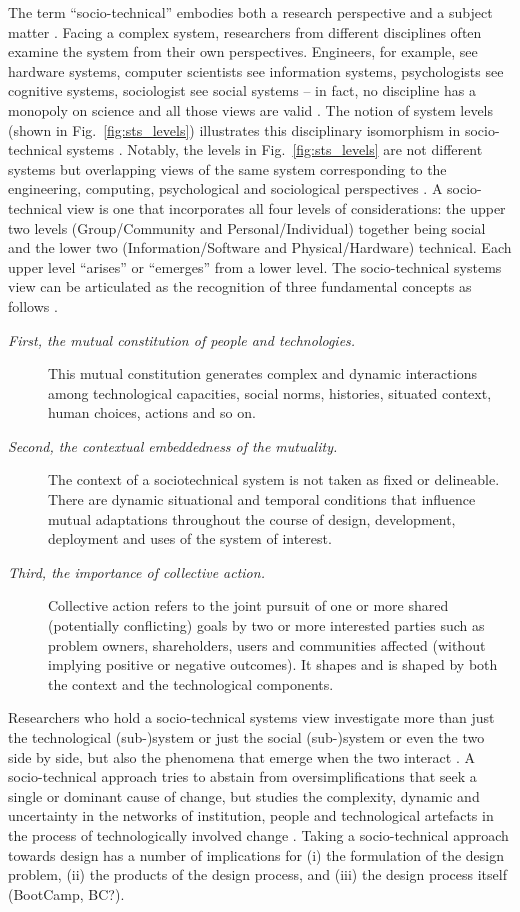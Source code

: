 The term ``socio-technical'' embodies both a research perspective and a subject matter \cite{Lee2001}. Facing a complex system, researchers from different disciplines often examine the system from their own perspectives. Engineers, for example, see hardware systems, computer scientists see information systems, psychologists see cognitive systems, sociologist see social systems -- in fact, no discipline has a monopoly on science and all those views are valid \cite{Whitworth2013}. 
The notion of system levels (shown in Fig.~\ref{fig:sts_levels}) illustrates this disciplinary isomorphism in socio-technical systems \cite{Whitworth2009,Whitworth2013}. Notably, the levels in Fig.~\ref{fig:sts_levels} are not different systems but overlapping views of the same system corresponding to the engineering, computing, psychological and sociological perspectives \cite{Whitworth2009}. A socio-technical view is one that incorporates all four levels of considerations: the upper two levels (Group/Community and Personal/Individual) together being social and the lower two (Information/Software and Physical/Hardware) technical. Each upper level ``arises'' or ``emerges'' from a lower level. 
% 
The socio-technical systems view can be articulated as the recognition of three fundamental concepts as follows \cite{Sawyer2014}. 
%
%
\begin{description}
\item[\textit{First, the mutual constitution of people and technologies.}] 
This mutual constitution generates complex and dynamic interactions among technological capacities, social norms, histories, situated context, human choices, actions and so on. 
%
\item[\textit{Second, the contextual embeddedness of the mutuality.}] 
The context of a sociotechnical system is not taken as fixed or delineable. There are dynamic situational and temporal conditions that influence 
mutual adaptations throughout the course of design, development, deployment and uses of the system of interest. 
%
\item[\textit{Third, the importance of collective action.}] 
Collective action refers to the joint pursuit of one or more shared (potentially conflicting) goals by two or more interested parties such as problem owners, shareholders, users  and communities affected (without implying positive or negative outcomes). It shapes and is shaped by both the context and the technological components. 
\end{description}
%
%
Researchers who hold a socio-technical systems view investigate more than just the technological (sub-)system or just the social (sub-)system or even the two side by side, but also the phenomena that emerge when the two interact \cite{Lee2001}. A socio-technical approach tries to abstain from oversimplifications that seek a single or dominant cause of change, but studies the complexity, dynamic and uncertainty in the networks of institution, people and technological artefacts in the process of technologically involved change \cite{Sawyer2014}. 
%
Taking a socio-technical approach towards design has a number of implications for (i) the formulation of the design problem, (ii) the products of the design process, and (iii) the design process itself (BootCamp, BC?).

